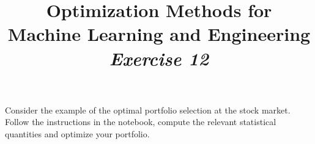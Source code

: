 



\author{}
\date{}
\title{Optimization Methods for \\Machine Learning and Engineering\\\vspace{0.5cm}\textit{Exercise 12}}
\maketitle


\setcounter{section}{12}
\setcounter{exercise}{0}


\begin{exercise}[subtitle={Notebook}]
Consider the example of the optimal portfolio selection at the stock market. Follow the instructions in the notebook, compute the relevant statistical quantities and optimize your portfolio.
\end{exercise}

